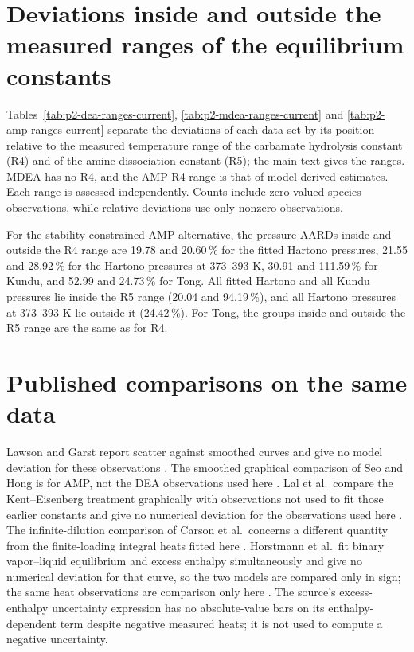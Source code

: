 \section{Deviations inside and outside the measured ranges of the equilibrium constants}\label{sec:p2-s-ranges}
Tables~\ref{tab:p2-dea-ranges-current}, \ref{tab:p2-mdea-ranges-current} and \ref{tab:p2-amp-ranges-current} separate the deviations of each data set by its position relative to the measured temperature range of the carbamate hydrolysis constant (R4) and of the amine dissociation constant (R5); the main text gives the ranges.
MDEA has no R4, and the AMP R4 range is that of model-derived estimates.
Each range is assessed independently.
Counts include zero-valued species observations, while relative deviations use only nonzero observations.





For the stability-constrained AMP alternative, the pressure AARDs inside and outside the R4 range are 19.78 and 20.60\,\% for the fitted Hartono pressures, 21.55 and 28.92\,\% for the Hartono pressures at 373--393 K, 30.91 and 111.59\,\% for Kundu, and 52.99 and 24.73\,\% for Tong.
All fitted Hartono and all Kundu pressures lie inside the R5 range (20.04 and 94.19\,\%), and all Hartono pressures at 373--393 K lie outside it (24.42\,\%).
For Tong, the groups inside and outside the R5 range are the same as for R4.

\section{Published comparisons on the same data}\label{sec:p2-s-published}
Lawson and Garst report scatter against smoothed curves and give no model deviation for these observations \cite[p.~26, Results and Accuracy of data]{lawsonGasSweeteningData1976}.
The smoothed graphical comparison of Seo and Hong is for AMP, not the DEA observations used here \cite[Table~1, Results and Discussion, p.~259]{seoSolubilitiesCarbonDioxide1996}.
Lal et al.\ compare the Kent--Eisenberg treatment graphically with observations not used to fit those earlier constants and give no numerical deviation for the observations used here \cite[pp.~683--684, Eqs.~9--13, Fig.~3]{lalSolubilityH2SCO21985}.
The infinite-dilution comparison of Carson et al.\ concerns a different quantity from the finite-loading integral heats fitted here \cite[Tables~2, 5--6, pp.~1289--1295]{carsonEnthalpySolutionCarbon2000}.
Horstmann et al.\ fit binary vapor--liquid equilibrium and excess enthalpy simultaneously and give no numerical deviation for that curve, so the two models are compared only in sign; the same heat observations are comparison only here \cite[pp.~1496--1500, Tables~6--7, Fig.~4(b)]{horstmannPhaseEquilibriumExcess2002}.
The source's excess-enthalpy uncertainty expression has no absolute-value bars on its enthalpy-dependent term despite negative measured heats; it is not used to compute a negative uncertainty.

